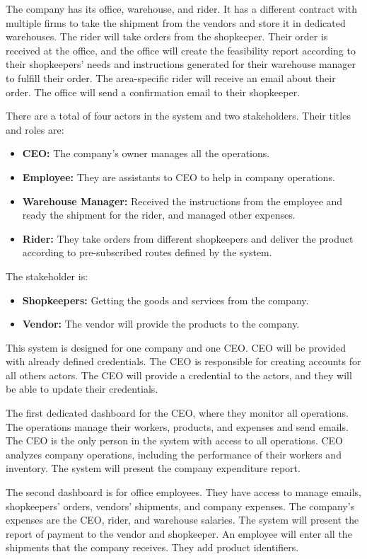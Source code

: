 \documentclass[12pt,a4paper]{report}
\begin{document}
The company has its office, warehouse, and rider. 
It has a different contract with multiple firms to take the shipment from the vendors and store it in dedicated warehouses. The rider will take orders from the shopkeeper. Their order is received at the office, and the office will create the feasibility report according to their shopkeepers' needs and instructions generated for their warehouse manager to fulfill their order. The area-specific rider will receive an email about their order. The office will send a confirmation email to their shopkeeper. 
 
There are a total of four actors in the system and two stakeholders. Their titles and roles are:
\begin{itemize}
\item \textbf{ CEO:} The company's owner manages all the operations.
\item \textbf{Employee:} They are assistants to CEO to help in company operations. 
\item \textbf{Warehouse Manager:} Received the instructions from the employee and ready the shipment for the rider, and managed other expenses.
\item \textbf{Rider:} They take orders from different shopkeepers and deliver the product according to pre-subscribed routes defined by the system.
\end{itemize}
The stakeholder is:
\begin{itemize}
\item \textbf{Shopkeepers:} Getting the goods and services from the company.
\item \textbf{Vendor:} The vendor will provide the products to the company. 
\end{itemize}
This system is designed for one company and one CEO. CEO will be provided with already defined credentials. The CEO is responsible for creating accounts for all others actors. The CEO will provide a credential to the actors, and they will be able to update their credentials. 
 
The first dedicated dashboard for the CEO, where they monitor all operations. The operations manage their workers, products, and expenses and send emails. The CEO is the only person in the system with access to all operations. CEO analyzes company operations, including the performance of their workers and inventory. The system will present the company expenditure report.
 
The second dashboard is for office employees. They have access to manage emails, shopkeepers' orders, vendors' shipments, and company expenses. The company's expenses are the CEO, rider, and warehouse salaries. The system will present the report of payment to the vendor and shopkeeper. An employee will enter all the shipments that the company receives. They add product identifiers.
 
\end{document}
